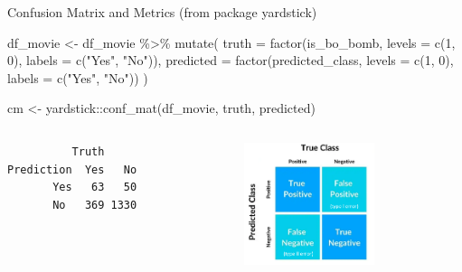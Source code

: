 \documentclass[
  10pt,
  ignorenonframetext,
]{beamer}
\newenvironment{Shaded}{\begin{snugshade}}{\end{snugshade}}
\newcommand{\AttributeTok}[1]{\textcolor[rgb]{0.40,0.45,0.13}{#1}}
\newcommand{\DecValTok}[1]{\textcolor[rgb]{0.68,0.00,0.00}{#1}}
\newcommand{\FunctionTok}[1]{\textcolor[rgb]{0.28,0.35,0.67}{#1}}
\newcommand{\NormalTok}[1]{\textcolor[rgb]{0.00,0.23,0.31}{#1}}
\newcommand{\OtherTok}[1]{\textcolor[rgb]{0.00,0.23,0.31}{#1}}
\newcommand{\SpecialCharTok}[1]{\textcolor[rgb]{0.37,0.37,0.37}{#1}}
\newcommand{\StringTok}[1]{\textcolor[rgb]{0.13,0.47,0.30}{#1}}
\begin{document}
\begin{frame}[fragile]{Confusion Matrix and Metrics (from package
yardstick)}
\label{confusion-matrix-and-metrics-from-package-yardstick}
\scriptsize

\begin{Shaded}
\begin{Highlighting}[]
\NormalTok{df\_movie }\OtherTok{\textless{}{-}}\NormalTok{ df\_movie }\SpecialCharTok{\%\textgreater{}\%}
  \FunctionTok{mutate}\NormalTok{(}
    \AttributeTok{truth =} \FunctionTok{factor}\NormalTok{(is\_bo\_bomb, }\AttributeTok{levels =} \FunctionTok{c}\NormalTok{(}\DecValTok{1}\NormalTok{, }\DecValTok{0}\NormalTok{), }\AttributeTok{labels =} \FunctionTok{c}\NormalTok{(}\StringTok{"Yes"}\NormalTok{, }\StringTok{"No"}\NormalTok{)),}
    \AttributeTok{predicted =} \FunctionTok{factor}\NormalTok{(predicted\_class, }\AttributeTok{levels =} \FunctionTok{c}\NormalTok{(}\DecValTok{1}\NormalTok{, }\DecValTok{0}\NormalTok{), }\AttributeTok{labels =} \FunctionTok{c}\NormalTok{(}\StringTok{"Yes"}\NormalTok{, }\StringTok{"No"}\NormalTok{))}
\NormalTok{  )}

\NormalTok{cm }\OtherTok{\textless{}{-}}\NormalTok{ yardstick}\SpecialCharTok{::}\FunctionTok{conf\_mat}\NormalTok{(df\_movie, truth, predicted)}
\end{Highlighting}
\end{Shaded}

\begin{columns}[T]
\begin{column}{0.48\textwidth}
\begin{verbatim}
          Truth
Prediction  Yes   No
       Yes   63   50
       No   369 1330
\end{verbatim}
\end{column}

\begin{column}{0.48\textwidth}
\includegraphics[width=1.5in,height=\textheight]{confusion_matrix.png}
\end{column}
\end{columns}
\end{frame}
\end{document}
